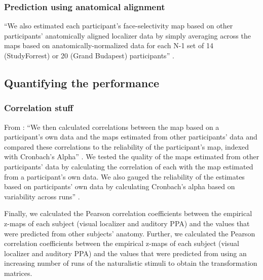 \subsubsection{Prediction using anatomical alignment}



%
``We also estimated each participant's face-selectivity map based on other
participants' anatomically aligned localizer data by simply averaging across the
maps based on anatomically-normalized data for each N-1 set of 14 (StudyForrest)
or 20 (Grand Budapest) participants'' \citep{jiahui2020predicting}.


\subsection{Quantifying the performance}


\subsubsection{Correlation stuff}
%
From \citep{jiahui2020predicting}: ``We then calculated correlations between the
map based on a participant’s own data and the maps estimated from other
participants' data and compared these correlations to the reliability of the
participant's map, indexed with Cronbach's Alpha'' \citep{jiahui2020predicting}.
%
We tested the quality of the maps estimated from other participants' data by
calculating the correlation of each with the map estimated from a participant's
own data. We also gauged the reliability of the estimates based on participants'
own data by calculating Cronbach's alpha based on variability across runs''
\citep{jiahui2020predicting}.

Finally, we calculated the Pearson correlation coefficients between the
empirical z-maps of each subject (visual localizer and auditory PPA) and the
values that were predicted from other subjects' anatomy.
%
Further, we calculated the Pearson correlation coefficients between the
empirical z-maps of each subject (visual localizer and auditory PPA) and the
values that were predicted from using an increasing number of runs of the
naturalistic stimuli to obtain the transformation matrices.

